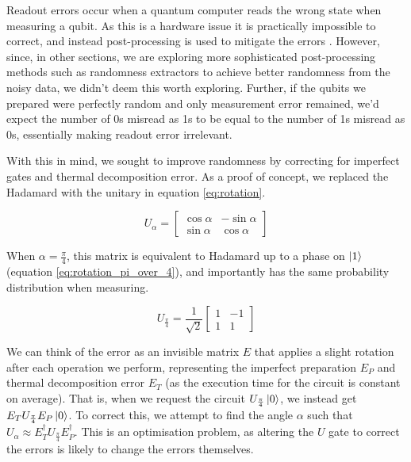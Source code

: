 \documentclass[lettersize,journal]{IEEEtran}
\begin{document}
Readout errors occur when a quantum computer reads the wrong state when measuring a qubit.
As this is a hardware issue it is practically impossible to correct, and instead post-processing is used to mitigate the errors \cite{aasen2024}.
However, since, in other sections, we are exploring more sophisticated post-processing methods such as randomness extractors to achieve better randomness from the noisy data, we didn't deem this worth exploring.
Further, if the qubits we prepared were perfectly random and only measurement error remained, we'd expect the number of 0s misread as 1s to be equal to the number of 1s misread as 0s, essentially making readout error irrelevant.

With this in mind, we sought to improve randomness by correcting for imperfect gates and thermal decomposition error.
As a proof of concept, we replaced the Hadamard with the unitary in equation \ref{eq:rotation}.

\begin{equation}
    U_\alpha = \begin{bmatrix}
        \cos \alpha & -\sin \alpha \\ 
        \sin \alpha & \cos \alpha
        \label{eq:rotation}
    \end{bmatrix}
\end{equation}

When $\alpha = \frac{\pi}{4}$, this matrix is equivalent to Hadamard up to a phase on $\ket{1}$ (equation \ref{eq:rotation_pi_over_4}), and importantly has the same probability distribution when measuring.

\begin{equation}
    U_\frac{\pi}{4} = \frac{1}{\sqrt{2}} \begin{bmatrix}
        1 & -1 \\
        1 & 1
        \label{eq:rotation_pi_over_4}
    \end{bmatrix}
\end{equation}

We can think of the error as an invisible matrix $E$ that applies a slight rotation after each operation we perform, representing the imperfect preparation $E_P$ and thermal decomposition error $E_T$ (as the execution time for the circuit is constant on average).
That is, when we request the circuit $U_\frac{\pi}{4} \ket{0}$, we instead get $E_T U_\frac{\pi}{4} E_P \ket{0}$.
To correct this, we attempt to find the angle $\alpha$ such that $U_\alpha \approx E_T^{\dagger} U_\frac{\pi}{4} E_P^{\dagger}$.
This is an optimisation problem, as altering the $U$ gate to correct the errors is likely to change the errors themselves.
\end{document}
